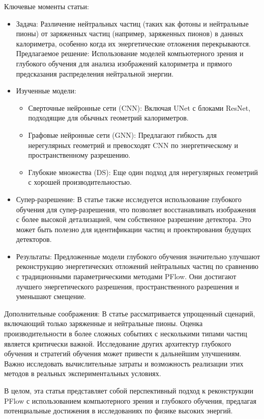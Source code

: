 \documentclass[a4paper,12pt]{extarticle}
\begin{document}
Ключевые моменты статьи:
\begin{itemize}
    \item Задача: Различение нейтральных частиц (таких как фотоны и нейтральные пионы) от заряженных частиц (например, заряженных пионов) в данных калориметра, особенно когда их энергетические отложения перекрываются.
    Предлагаемое решение: Использование моделей компьютерного зрения и глубокого обучения для анализа изображений калориметра и прямого предсказания распределения нейтральной энергии.
    \item Изученные модели: \begin{itemize}
        \item Сверточные нейронные сети (CNN): Включая UNet с блоками ResNet, подходящие для обычных геометрий калориметров.
        \item Графовые нейронные сети (GNN): Предлагают гибкость для нерегулярных геометрий и превосходят CNN по энергетическому и пространственному разрешению.
        \item Глубокие множества (DS): Еще один подход для нерегулярных геометрий с хорошей производительностью.
    \end{itemize}
    \item Супер-разрешение: В статье также исследуется использование глубокого обучения для супер-разрешения, что позволяет восстанавливать изображения с более высокой детализацией, чем собственное разрешение детектора. Это может быть полезно для идентификации частиц и проектирования будущих детекторов.
    \item Результаты: Предложенные модели глубокого обучения значительно улучшают реконструкцию энергетических отложений нейтральных частиц по сравнению с традиционными параметрическими методами PFlow. Они достигают лучшего энергетического разрешения, пространственного разрешения и уменьшают смещение.
\end{itemize}

Дополнительные соображения:
В статье рассматривается упрощенный сценарий, включающий только заряженные и нейтральные пионы. Оценка производительности в более сложных событиях с несколькими типами частиц является критически важной.
Исследование других архитектур глубокого обучения и стратегий обучения может привести к дальнейшим улучшениям.
Важно исследовать вычислительные затраты и возможность реализации этих методов в реальных экспериментальных условиях.

В целом, эта статья представляет собой перспективный подход к реконструкции PFlow с использованием компьютерного зрения и глубокого обучения, предлагая потенциальные достижения в исследованиях по физике высоких энергий.
\end{document}
